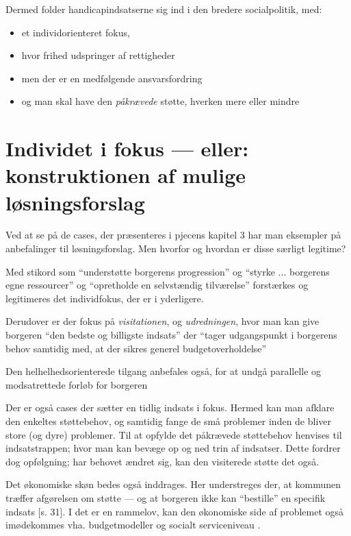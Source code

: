 Dermed folder handicapindsatserne sig ind i den bredere socialpolitik, med:
\begin{itemize}
  \item
    et individorienteret fokus, 
  \item
    hvor frihed udspringer af rettigheder
  \item
    men der er en medfølgende ansvarsfordring
  \item
    og man skal have den \textit{påkrævede} støtte, hverken mere eller mindre
\end{itemize}
\section{Individet i fokus — eller: konstruktionen af mulige løsningsforslag}
Ved at se på de cases, der præsenteres i pjecens kapitel 3 har man eksempler på anbefalinger til løsningsforslag.
Men hvorfor og hvordan er disse særligt legitime? 

Med stikord som “understøtte borgerens progression” og “styrke ... borgerens egne ressourcer” og “opretholde en selvstændig tilværelse” \autocite[s. 19]{klStyringAfDet2017} forstærkes og legitimeres det individfokus, der er i  yderligere.

Derudover er der fokus på \textit{visitationen}, og \textit{udredningen}, hvor man kan give borgeren “den bedste og billigste indsats” der “tager udgangspunkt i borgerens behov samtidig med, at der sikres generel budgetoverholdelse” \autocite[ss. 18, 28-30]{klStyringAfDet2017}

Den helhelhedsorienterede tilgang anbefales også, for at undgå parallelle og modsatrettede forløb for borgeren \autocite[ss. 34-35]{klStyringAfDet2017}

Der er også cases der sætter en tidlig indsats i fokus.
Hermed kan man afklare den enkeltes støttebehov, og samtidig fange de små problemer inden de bliver store (og dyre) problemer\autocite[ss 20-21]{klStyringAfDet2017}.
Til at opfylde det påkrævede støttebehov henvises til indsatstrappen; hvor man kan bevæge op og ned trin af indsatser.
Dette fordrer dog opfølgning; har behovet ændret sig, kan den visiterede støtte det også.

Det økonomiske skøn bedes også inddrages. Her understreges der, at kommunen træffer afgørelsen om støtte — og at borgeren ikke kan “bestille” en specifik indsats [s. 31].
I det  er en rammelov, kan den økonomiske side af problemet også imødekommes vha. budgetmodeller og socialt serviceniveau \autocite[ss. 36-37]{klStyringAfDet2017}.


